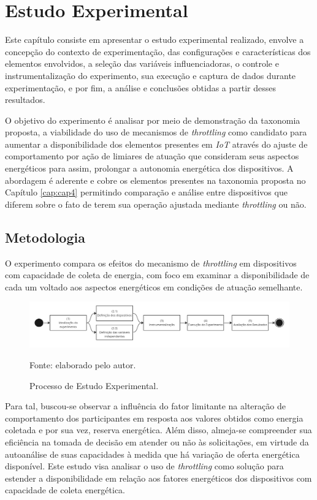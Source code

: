\chapter{Estudo Experimental}
\label{cap:cap6}

Este capítulo consiste em apresentar o estudo experimental realizado, envolve a concepção do contexto de experimentação, das configurações e características dos elementos envolvidos, a seleção das variáveis influenciadoras, o controle e instrumentalização do experimento, sua execução e captura de dados durante experimentação, e por fim, a análise e conclusões obtidas a partir desses resultados. 

O objetivo do experimento é analisar por meio de demonstração da taxonomia proposta, a viabilidade do uso de mecanismos de \textit{throttling} como candidato para aumentar a disponibilidade dos elementos presentes em \textit{IoT} através do ajuste de comportamento por ação de limiares de atuação que consideram seus aspectos energéticos para assim,  prolongar a autonomia energética dos dispositivos. A abordagem é aderente e cobre os elementos presentes na taxonomia proposta no Capítulo \ref{cap:cap4} permitindo comparação e análise entre dispositivos que diferem sobre o fato de terem sua operação ajustada mediante \textit{throttling} ou não. 

\section{Metodologia}

O experimento compara os efeitos do mecanismo de \textit{throttling} em dispositivos com capacidade de coleta de energia, com foco em examinar a disponibilidade de cada um voltado aos aspectos energéticos em condições de atuação semelhante.

\begin{figure}[H]
	\centering
	\caption{Processo de Estudo Experimental.}
	\label{fig:cap6metodologia}
	\includegraphics[width=1\linewidth]{Imagens/cap6/cap6metodologia.jpg}
	
	Fonte: elaborado pelo autor.
\end{figure} 

Para tal, buscou-se observar a influência do fator limitante na alteração de comportamento dos participantes em resposta aos valores obtidos como energia coletada e por sua vez, reserva energética. Além disso, almeja-se compreender sua eficiência na tomada de decisão em atender ou não às solicitações, em virtude da autoanálise de suas capacidades à medida que há variação de oferta energética disponível. Este estudo visa analisar o uso de \textit{throttling} como solução para estender a disponibilidade em relação aos fatores energéticos dos dispositivos com capacidade de coleta energética. 

